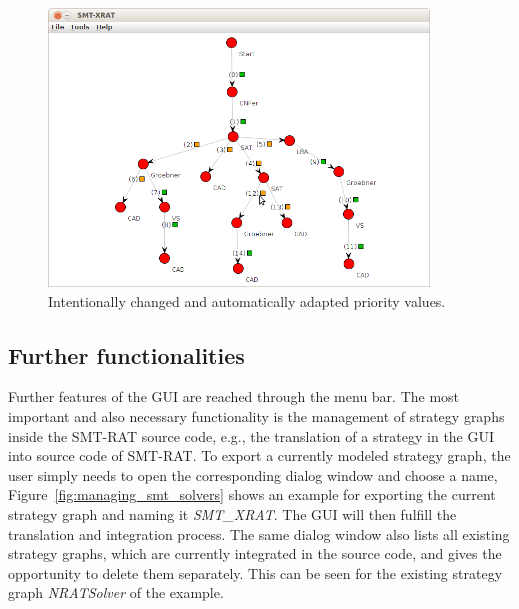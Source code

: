 \begin{figure}
  \begin{center}
    \includegraphics[width=0.9\textwidth]{graphics/smt-xrat_priority_b.png}
  \end{center}
  \caption{Intentionally changed and automatically adapted priority values.}
  \label{fig:smt-xrat_priority_b}
\end{figure}

\subsection{Further functionalities}
\label{sec:further_functionalities}
Further features of the GUI are reached through the menu bar. The most important
and also necessary functionality is the management of strategy graphs inside
the SMT-RAT source code, e.g., the translation of a strategy in the GUI into source code
of SMT-RAT. To export a currently modeled strategy graph, the user simply needs 
to open the corresponding dialog window and choose a name, Figure~\ref{fig:managing_smt_solvers}
shows an example for exporting the current strategy graph and naming it 
\emph{SMT\_XRAT}. The GUI will then fulfill the translation and integration process. 
The same dialog window also lists all existing strategy graphs, which are currently 
integrated in the source code, and gives the opportunity to delete them separately.
This can be seen for the existing strategy graph \emph{NRATSolver} of the example.

